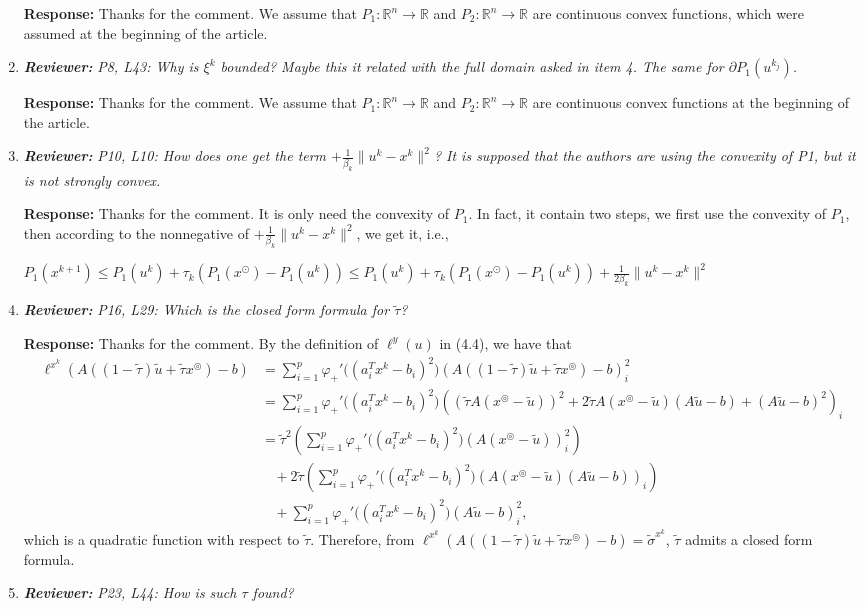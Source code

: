 \documentclass{article}
\def\R{\mathbb{R}}
\begin{document}
\begin{enumerate}
	\textbf{Response:} Thanks for the comment. We assume that $P_1:\R^n\rightarrow\R$ and $P_2:\R^n\rightarrow\R$ are continuous convex functions, which were assumed at the beginning of the article.

	\item  \textit{\textbf{Reviewer:}} \textit{P8, L43: Why is $\xi^k$ bounded? Maybe this it related with the full domain asked in item 4. The same for $\partial P_1(u^{k_j})$.}
	
	\textbf{Response:} Thanks for the comment. We assume that $P_1:\R^n\rightarrow\R$ and $P_2:\R^n\rightarrow\R$ are continuous convex functions at the beginning of the article.

	\item  \textit{\textbf{Reviewer:}} \textit{P10, L10: How does one get the term $+\frac{1}{\beta_k}\|u^k - x^k\|^2$? It is supposed that the authors are using the convexity of P1, but it is not strongly convex.}
	
	\textbf{Response:} Thanks for the comment. It is only need the convexity of $P_1$. In fact, it contain two steps, we first use the convexity of $P_1$, then according to the nonnegative of $+\frac{1}{\beta_k}\|u^k - x^k\|^2$, we get it, i.e.,

$P_1(x^{k+1})\leq P_1(u^k) + \tau_k(P_1(x^\odot) - P_1(u^k))\leq P_1(u^k) + \tau_k(P_1(x^\odot) - P_1(u^k)) + \frac{1}{2\beta_k}\|u^k - x^k\|^2$

	\item  \textit{\textbf{Reviewer:}} \textit{P16, L29: Which is the closed form formula for $\tilde{\tau}$?}
	
	\textbf{Response:} Thanks for the comment. By the definition of $\ell^{y}(u)$ in (4.4), we have that
\begin{equation*}
\begin{aligned}
\ell^{x^k}(A((1-\widetilde\tau)\widetilde u + \widetilde\tau x^\circledcirc) - b) &= \sum_{i=1}^p\varphi_+'\big((a_i^T x^k - b_i)^2\big)(A((1-\widetilde\tau)\widetilde u + \widetilde\tau x^\circledcirc) - b)_i^2\\
& = \sum_{i=1}^p\varphi_+'\big((a_i^T x^k - b_i)^2\big)((\widetilde\tau A(x^\circledcirc - \widetilde u))^2 + 2\widetilde\tau A(x^\circledcirc - \widetilde u)(A\widetilde u - b) + (A\widetilde u - b)^2)_i\\
&= \widetilde\tau^2(\sum_{i=1}^p\varphi_+'\big((a_i^T x^k - b_i)^2\big)(A(x^\circledcirc - \widetilde u))_i^2) \\
&~~~~+ 2\widetilde\tau (\sum_{i=1}^p\varphi_+'\big((a_i^T x^k - b_i)^2\big)(A(x^\circledcirc - \widetilde u)(A\widetilde u - b))_i) \\
&~~~~+ \sum_{i=1}^p\varphi_+'\big((a_i^T x^k - b_i)^2\big)(A\widetilde u - b)^2_i,
\end{aligned}
\end{equation*}
which is a quadratic function with respect to $\widetilde\tau$. Therefore, from $\ell^{x^k}(A((1-\widetilde\tau)\widetilde u + \widetilde\tau x^\circledcirc) - b) = \tilde{\sigma}^{x^k}$, $\widetilde\tau$ admits a closed form formula.
	\item  \textit{\textbf{Reviewer:}} \textit{P23, L44: How is such $\tau$ found?}
	

\end{enumerate}
\end{document}
